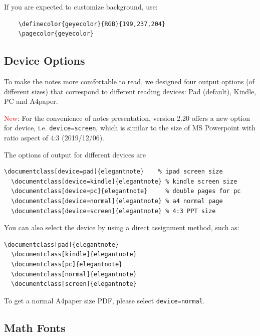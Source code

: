 \documentclass[en,hazy,screen,blue,14pt]{elegantnote}
\begin{document}
\begin{remark}
  If you are expected to customize background, use:
  \begin{lstlisting}
    \definecolor{geyecolor}{RGB}{199,237,204}
    \pagecolor{geyecolor}
  \end{lstlisting}
\end{remark}


\subsection{Device Options}

To make the notes more comfortable to read, we designed four output options (of different sizes) that correspond to different reading devices: Pad (default), Kindle, PC and A4paper. 

\textcolor{red}{New}: For the convenience of notes presentation, version 2.20 offers a new option for device, i.e. \lstinline{device=screen}, which is similar to the size of MS Powerpoint with ratio aspect of 4:3 (2019/12/06).

The options of output for different devices are
\begin{lstlisting}[frame=none]  
  \documentclass[device=pad]{elegantnote}    % ipad screen size
  \documentclass[device=kindle]{elegantnote} % kindle screen size
  \documentclass[device=pc]{elegantnote}     % double pages for pc 
  \documentclass[device=normal]{elegantnote} % a4 normal page
  \documentclass[device=screen]{elegantnote} % 4:3 PPT size
\end{lstlisting}

\begin{note}
You can also select the device by using a direct assignment method, such as:
\end{note}

\begin{lstlisting}[frame=none]  
  \documentclass[pad]{elegantnote}
  \documentclass[kindle]{elegantnote}
  \documentclass[pc]{elegantnote}
  \documentclass[normal]{elegantnote}
  \documentclass[screen]{elegantnote}
\end{lstlisting}

\begin{note}
To get a normal A4paper size PDF, please select \lstinline{device=normal}.
\end{note}

\subsection{Math Fonts}
\end{document}
